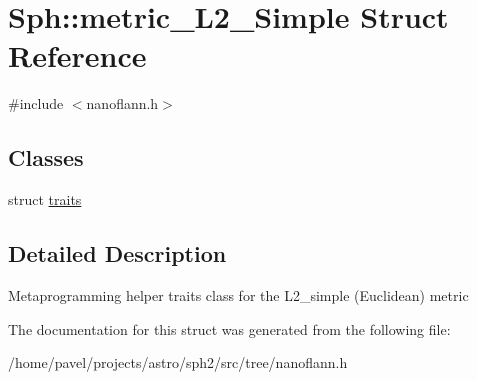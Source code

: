 \hypertarget{structSph_1_1metric__L2__Simple}{}\section{Sph\+:\+:metric\+\_\+\+L2\+\_\+\+Simple Struct Reference}
\label{structSph_1_1metric__L2__Simple}


{\ttfamily \#include $<$nanoflann.\+h$>$}

\subsection*{Classes}
\begin{DoxyCompactItemize}
\item 
struct \hyperlink{structSph_1_1metric__L2__Simple_1_1traits}{traits}
\end{DoxyCompactItemize}


\subsection{Detailed Description}
Metaprogramming helper traits class for the L2\+\_\+simple (Euclidean) metric 

The documentation for this struct was generated from the following file\+:\begin{DoxyCompactItemize}
\item 
/home/pavel/projects/astro/sph2/src/tree/nanoflann.\+h\end{DoxyCompactItemize}
